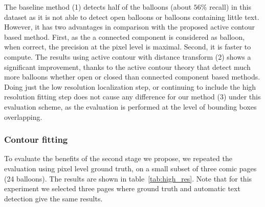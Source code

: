 \documentclass[conference]{IEEEtran}
\begin{document}
The baseline method (1) detects half of the balloons (about $56\%$ recall) in this dataset as it is not able to detect open balloons or balloons containing little text. However, it has two advantages in comparison with the proposed active contour based method. First, as the a connected component is considered as balloon, when correct, the precision at the pixel level is maximal. Second, it is faster to compute.
The results using active contour with distance transform (2) shows a significant improvement, thanks to the active contour theory that detect much more balloons whether open or closed than connected component based methods. 
Doing just the low resolution localization step, or continuing to include the high resolution fitting step does not cause any difference for our method (3) under this evaluation scheme, as the evaluation is performed at the level of bounding boxes overlapping. 

\subsubsection{Contour fitting}
To evaluate the benefits of the second stage we propose, we repeated the evaluation using pixel level ground truth, on a small subset of three comic pages (24 balloons). The results are shown in table~\ref{tab:high_res}. Note that for this experiment we selected three pages where ground truth and automatic text detection give the same results.

\end{document}
